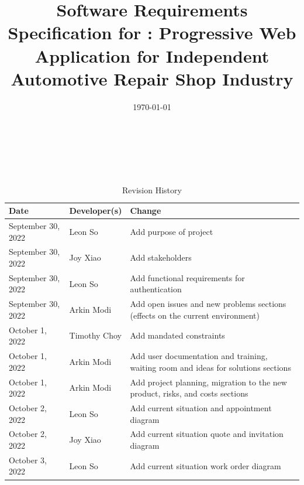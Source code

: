 \documentclass[12pt]{article}
\begin{document}
\title{Software Requirements Specification for \progname: Progressive Web Application for Independent
	Automotive Repair Shop Industry}
\author{\authname}
\date{\today}

\maketitle

~\newpage


\tableofcontents

~\newpage

\begin{table}[hp]
	\caption{Revision History} \label{TblRevisionHistory}
	\begin{tabularx}{\textwidth}{llX}
		\toprule
		\textbf{Date}      & \textbf{Developer(s)} & \textbf{Change}                                                                    \\
		\midrule
		September 30, 2022 & Leon So               & Add purpose of project                                                             \\
		September 30, 2022 & Joy Xiao              & Add stakeholders                                                                   \\
		September 30, 2022 & Leon So               & Add functional requirements for authentication                                     \\
		September 30, 2022 & Arkin Modi            & Add open issues and new problems sections (effects on the current environment)     \\
		October 1, 2022    & Timothy Choy          & Add mandated constraints                                                           \\
		October 1, 2022    & Arkin Modi            & Add user documentation and training, waiting room and ideas for solutions sections \\
		October 1, 2022    & Arkin Modi            & Add project planning, migration to the new product, risks, and costs sections      \\
		October 2, 2022    & Leon So               & Add current situation and appointment diagram                                      \\
		October 2, 2022    & Joy Xiao              & Add current situation quote and invitation diagram                                 \\
		October 3, 2022    & Leon So               & Add current situation work order diagram                                           \\

\end{tabularx}
\end{table}
\end{document}
